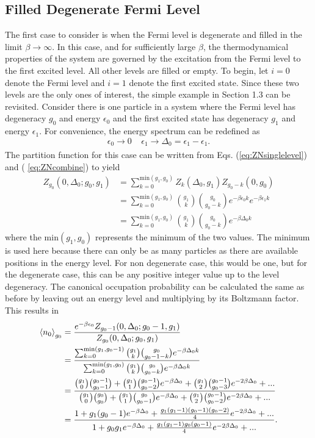 \subsection{Filled Degenerate Fermi Level}
The first case to consider is when the Fermi level is degenerate and filled in the limit $\beta \to \infty$. In this case, and for sufficiently large $\beta$, the thermodynamical properties of the  system are governed by the excitation from the Fermi level to the first excited level. All other levels are filled or empty. To begin, let $i=0$ denote the Fermi level and $i=1$ denote the first excited state. Since these two levels are the only ones of interest, the simple example in Section 1.3 can be revisited. Consider there is one particle in a system where the Fermi level has degeneracy $g_0$ and energy $\epsilon_0$ and the first excited state has degeneracy $g_1$ and energy $\epsilon_1$. For convenience, the energy spectrum can be redefined as
\begin{equation}
    \epsilon_0 \xrightarrow[]{} 0\ \ \ \ \ \epsilon_1\xrightarrow[]{}\Delta_0=\epsilon_1-\epsilon_1.\nonumber
\end{equation}
The partition function for this case can be written from Eqs. (\ref{eq:ZNsinglelevel}) and ( \ref{eq:ZNcombine}) to yield
\begin{align}
    Z_{g_0}(0,\Delta_0;g_0,g_1)&=\sum_{k=0}^{\text{min}(g_1,g_0)} Z_k(\Delta_0,g_1)Z_{g_0-k}(0,g_0)\nonumber\\
    &=\sum_{k=0}^{\text{min}(g_1,g_0)} {g_1 \choose k}{g_0\choose g_0-k} e^{-\beta \epsilon_0 k}e^{-\beta \epsilon_1 k}\nonumber\\
    &=\sum_{k=0}^{\text{min}(g_1,g_0)} {g_1 \choose k}{g_0\choose g_0-k} e^{-\beta \Delta_0 k}
\end{align}
where the $\text{min}(g_1,g_0)$ represents the minimum of the two values. The minimum is used here because there can only be as many particles as there are available positions in the energy level. For non degenerate case, this would be one, but for the degenerate case, this can be any positive integer value up to the level degeneracy. The canonical occupation probability can be calculated the same as before by leaving out an energy level and multiplying by its Boltzmann factor. This results in 
\begin{align}
    \left<{n_0}\right>_{g_0}&=\frac{e^{-\beta \epsilon_0}Z_{g_0-1}(0,\Delta_0;g_0-1,g_1)}{Z_{g_0}(0,\Delta_0;g_0,g_1)}\nonumber\\
    &=\frac{\sum_{k=0}^{\text{min}(g_1,g_0-1)} {g_1 \choose k}{g_0\choose g_0-1-k} e^{-\beta \Delta_0 k}}{\sum_{k=0}^{\text{min}(g_1,g_0)} {g_1 \choose k}{g_0\choose g_0-k} e^{-\beta \Delta_0 k }}\nonumber\\
    &=\frac{{g_1\choose 0}{g_0-1\choose g_0-1}+{g_1 \choose 1}{g_0-1\choose g_0-2}e^{-\beta\Delta_0}+{g_1\choose 2}{g_0-1\choose g_0-3}e^{-2\beta\Delta_0}+...}{{g_1\choose 0}{g_0\choose g_0}+{g_1 \choose 1}{g_0\choose g_0-1}e^{-\beta\Delta_0}+{g_1\choose 2}{g_0-1\choose g_0-2}e^{-2\beta\Delta_0}+...}\nonumber\\
    &=\frac{1+g_1(g_0-1)e^{-\beta\Delta_0}+\frac{g_1(g_1-1)(g_0-1)(g_0-2)}{4}e^{-2\beta\Delta_0}+...}{1+g_0g_1e^{-\beta\Delta_0}+\frac{g_1(g_1-1)g_0(g_0-1)}{4}e^{-2\beta\Delta_0}+...}.
\end{align}
